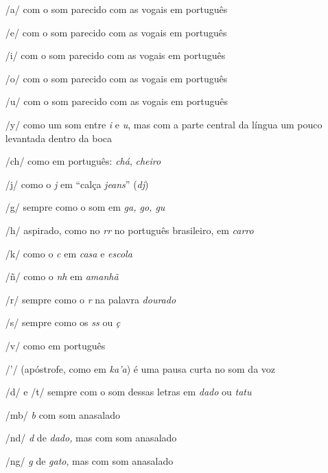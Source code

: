 \begin{itemize}
\item[/a/] com o som parecido com as vogais em português
\item[/e/] com o som parecido com as vogais em português
\item[/i/] com o som parecido com as vogais em português
\item[/o/] com o som parecido com as vogais em português
\item[/u/] com o som parecido com as vogais em português

\item[/y/] como um som entre \emph{i} e \emph{u}, mas com a parte central da
língua um pouco levantada dentro da boca

\item[/ch/] como em português: \emph{chá}, \emph{cheiro}

\item[/j/] como o \emph{j} em ``calça \emph{jeans}'' (\emph{dj})

\item[/g/] sempre como o som em \emph{ga, go, gu }

\item[/h/] aspirado, como no \emph{rr} no português brasileiro, em \emph{carro}

\item[/k/] como o \emph{c} em \emph{casa} e \emph{escola}

\item[/ñ/] como o \emph{nh} em \emph{amanhã}

\item[/r/] sempre como o \emph{r} na palavra \emph{dourado}

\item[/s/] sempre como os \emph{ss} ou \emph{ç}

\item[/v/] como em português

\item[/'/] (apóstrofe, como em \emph{ka'a}) é uma pausa curta no som da voz

\item[/d/] e /t/ sempre com o som dessas letras em \emph{dado} ou \emph{tatu}

\item[/mb/] \emph{b} com som anasalado

\item[/nd/] \emph{d} de \emph{dado,} mas com som anasalado

\item[/ng/] \emph{g} de \emph{gato}, mas com som anasalado



\end{itemize}
